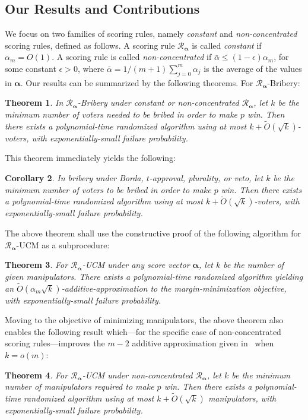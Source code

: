 \documentclass[letterpaper]{article} %
\newtheorem{theorem}{Theorem}
\newtheorem{corollary}[theorem]{Corollary}
\theoremstyle{definition}
\newcommand\vecgreek{\bm}
\newcommand{\veca}{\vecgreek{\alpha}}
\newcommand{\Ra}{\mathcal{R}_{\veca}}
\begin{document}
\subsection{Our Results and Contributions}
We focus on two families of scoring rules, namely \emph{constant} and \emph{non-concentrated} scoring rules, defined as follows. A scoring rule $\Ra$ is called \emph{constant} if $\alpha_m = O(1)$. A scoring rule is called \emph{non-concentrated} if $\bar{\alpha} \leq (1-\epsilon)\alpha_m$, for some constant $\epsilon > 0$,
where $\bar{\alpha} = 1/(m+1) \sum_{j=0}^{m} \alpha_j$ is the average of the values in $\veca$.
Our results can be summarized by the following theorems. For $\Ra$-Bribery:
\begin{theorem}\label{thr:brib}
	In $\Ra$-Bribery under constant or non-concentrated $\Ra$,  let $k$ be the minimum number of voters needed to be bribed in order to make $p$ win. Then	there exists a  polynomial-time randomized algorithm using at most $k+\widetilde{O}(\sqrt{k})$-voters, with exponentially-small failure probability.
\end{theorem}
This theorem immediately yields the following:
\begin{corollary}
	In bribery under Borda, $t$-approval, plurality, or veto, let $k$ be the minimum number of voters to be bribed in order to make $p$ win. Then	there exists a  polynomial-time randomized algorithm using at most $k+\widetilde{O}(\sqrt{k})$-voters, with exponentially-small failure probability.
\end{corollary}

The above theorem shall use the constructive proof of the following  algorithm for $\Ra$-UCM as a subprocedure:
\begin{theorem}\label{thr:UCM-margin}
	For $\Ra$-UCM under any score vector $\veca$, let $k$ be the number of given manipulators. There exists a  polynomial-time randomized algorithm  yielding an $\widetilde{O}(\alpha_m \sqrt{k})$-additive-approximation to the margin-minimization objective, with exponentially-small failure probability.
\end{theorem}



Moving to the objective of minimizing manipulators, the above theorem also enables the following result which---for the specific case of non-concentrated scoring rules---improves the $m-2$ additive approximation given in~\cite{DBLP:conf/sigecom/XiaCP10} when $k = o(m)$:
\begin{theorem}\label{thr:UCM-number}
	For $\Ra$-UCM under non-concentrated $\Ra$,  let $k$ be the minimum number of manipulators required to make $p$ win. Then there exists a  polynomial-time randomized algorithm using at most $k+\widetilde{O}(\sqrt{k})$ manipulators, with exponentially-small failure probability.
\end{theorem}
\end{document}
